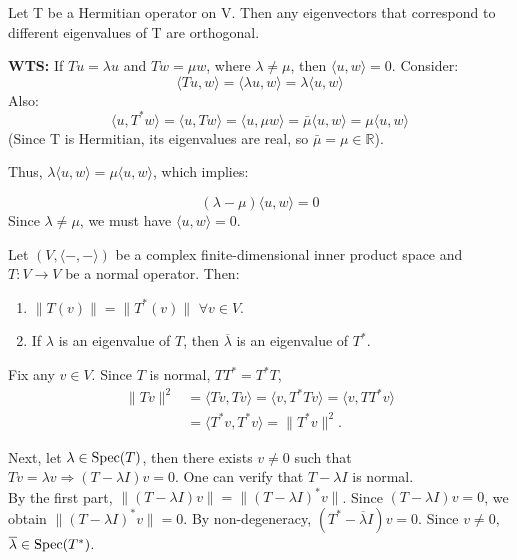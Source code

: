 \begin{theorem}
Let T be a Hermitian operator on V. Then any eigenvectors that correspond to different eigenvalues of T are orthogonal.
\label{orthogonal eigenvectors Hermitian case}
\end{theorem}

\begin{pfbox}
\textbf{WTS:} If $Tu = \lambda u$ and $Tw = \mu w$, where $\lambda \neq \mu$, then $\langle u, w \rangle = 0$.
Consider:
\[
\langle Tu, w \rangle = \langle \lambda u, w \rangle = \lambda \langle u, w \rangle
\]
Also:
\[
\langle u, T^*w \rangle = \langle u, Tw \rangle = \langle u, \mu w \rangle = \bar{\mu} \langle u, w \rangle = \mu \langle u, w \rangle
\]
(Since T is Hermitian, its eigenvalues are real, so $\bar{\mu} = \mu \in \mathbb{R}$).

Thus, $\lambda \langle u, w \rangle = \mu \langle u, w \rangle$, which implies:

\[
(\lambda - \mu) \langle u, w \rangle = 0
\]
Since $\lambda \neq \mu$, we must have $\langle u, w \rangle = 0$.
\end{pfbox}


\begin{proposition}
Let $(V,\langle-,-\rangle)$ be a complex finite-dimensional inner product space and $T:V\to V$ be a normal operator. 
Then:
\begin{enumerate}
    \item $\|T(v)\|=\|T^*(v)\| \,\, \forall v\in V.$
    \item If $\lambda$ is an eigenvalue of $T$, then $\overline{\lambda}$ is an eigenvalue of $T^*.$
\end{enumerate}
\label{conjugate transpose of normal matrix}
\end{proposition}


\begin{pfbox}
Fix any $v\in V$. Since $T$ is normal, $TT^*=T^*T$,
\begin{align*}
\|Tv\|^2 &=\langle Tv,Tv\rangle =\langle v,T^*Tv\rangle=\langle v,TT^*v\rangle \\
&=\langle T^*v,T^*v\rangle =\|T^*v\|^2.
\end{align*}

Next, let $\lambda\in \operatorname{Spec}(T)$, then there exists $v\neq 0$ such that $Tv=\lambda v \Rightarrow (T-\lambda I)v=0$.
One can verify that $T-\lambda I$ is normal.\\
By the first part,
$ \|(T-\lambda I)v\| = \|(T-\lambda I)^*v\|$.
Since
$(T-\lambda I)v=0$, we obtain $\|(T-\lambda I)^*v\|=0$.
By non-degeneracy, $(T^*-\overline{\lambda}I)v=0$.
Since $v\neq0$, $\overline{\lambda}\in \operatorname{Spec}(T^*)$.
\end{pfbox}

